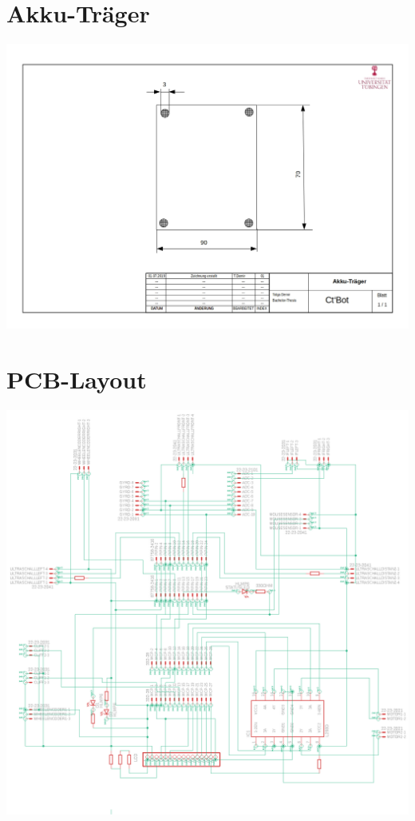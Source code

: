 \documentclass[a4paper,cleardoubleempty,BCOR1cm]{book}
\begin{document}
\section{Akku-Träger}
\includegraphics[angle=90,origin=c, scale= 0.7]{images/Zeichnung_Akku.jpg}
\section{PCB-Layout}
\includegraphics[angle=0,origin=c, scale= 0.75]{images/Layout.png}
\end{document}

